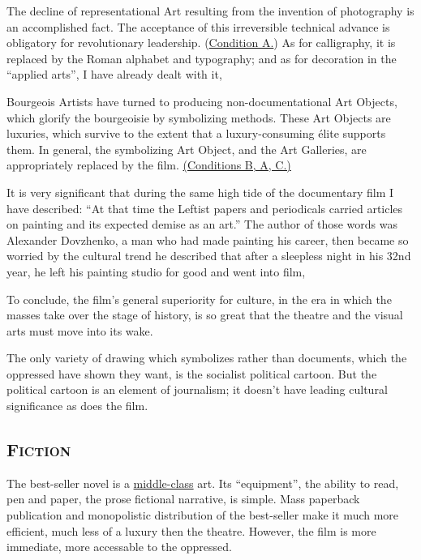 The decline of representational Art resulting from the invention of photography is an accomplished fact. The acceptance of this irreversible technical advance is obligatory for revolutionary leadership. (\uline{Condition A.}) As for calligraphy, it is replaced by the Roman alphabet and typography; and as for decoration in the \enquote{applied arts}, I have already dealt with it, 

Bourgeois Artists have turned to producing non-documentational Art Objects, which glorify the bourgeoisie by symbolizing methods. These Art Objects are luxuries, which survive to the extent that a luxury-consuming \'{e}lite supports them. In general, the symbolizing Art Object, and the Art Galleries, are appropriately replaced by the film. \uline{(Conditions B, A, C.)}

It is very significant that during the same high tide of the documentary film I have described: \enquote{At that time the Leftist papers and periodicals carried articles on painting and its expected demise as an art.} The author of those words was Alexander Dovzhenko, a man who had made painting his career, then became so worried by the cultural trend he described that after a sleepless night in his 32nd year, he left his painting studio for good and went into film, 

To conclude, the film's general superiority for culture, in the era in which the masses take over the stage of history, is so great that the theatre and the visual arts must move into its wake. 

The only variety of drawing which symbolizes rather than documents, which the oppressed have shown they want, is the socialist political cartoon. But the political cartoon is an element of journalism; it doesn't have leading cultural significance as does the film. 

\subsection*{\textsc{Fiction}}
The best-seller novel is a \uline{middle-class} art. Its \enquote{equipment}, the ability to read, pen and paper, the prose fictional narrative, is simple. Mass paperback publication and monopolistic distribution of the best-seller make it much more efficient, much less of a luxury then the theatre. However, the film is more immediate, more accessable to the oppressed. 

